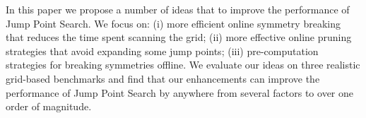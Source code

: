 In this paper we propose a number of ideas that to improve the
performance of Jump Point Search. We focus on: (i) more efficient online 
symmetry breaking that reduces the time spent scanning the grid; 
(ii) more effective online pruning strategies that avoid expanding some jump
points; (iii) pre-computation strategies for breaking symmetries offline.
We evaluate our ideas on three realistic grid-based benchmarks and
find that our enhancements can improve the performance of Jump Point Search
by anywhere from several factors to over one order of magnitude. 

